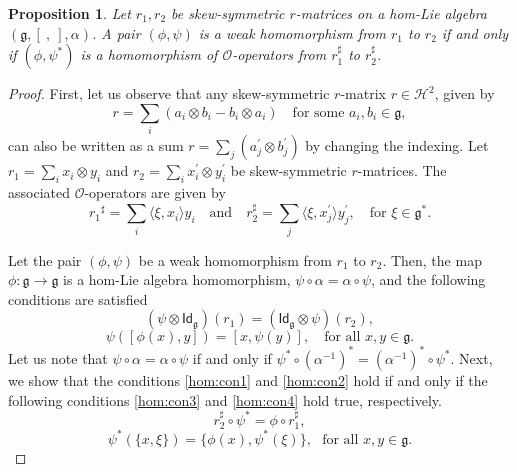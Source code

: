 \documentclass[a4paper,11pt]{amsart}
\theoremstyle{plain}
\newtheorem{proposition}[theorem]{Proposition}
\theoremstyle{definition}
\theoremstyle{remark}
\numberwithin{equation}{section}
\begin{document}
\begin{proposition}
Let $r_1,r_2$ be skew-symmetric $r$-matrices on a hom-Lie algebra $(\mathfrak{g},[~,~],\alpha)$. A pair $(\phi,\psi)$ is a weak homomorphism from $r_1$ to $r_2$ if and only if $(\phi,\psi^*)$ is a homomorphism of $\mathcal{O}$-operators from $r_1^\sharp$ to $r_2^\sharp$.
\end{proposition}
\begin{proof} 
First, let us observe that any skew-symmetric $r$-matrix 
$r\in \mathcal{H}^2$, given by $$r=\sum_{i}(a_i\otimes b_i- b_i\otimes a_i)\quad\mbox{for some } a_i, b_i\in \mathfrak{g},$$ can also be written as a sum $r=\sum_{j}(a_j^\prime\otimes b_j^\prime)$ by changing the indexing. Let $r_1=\sum_i x_i\otimes y_i$ and $r_2=\sum_i x^{\prime}_i\otimes y^{\prime}_i$ be skew-symmetric $r$-matrices. The associated $\mathcal{O}$-operators are given by 
$${r_1}^\sharp=\sum\limits_{i}\langle\xi,x_i\rangle y_i \quad \mbox{and}\quad r_2^\sharp=\sum\limits_{j}\langle\xi,x^{\prime}_j\rangle y^{\prime}_j, \quad\mbox{for }\xi\in \mathfrak{g}^*.$$  

Let the pair $(\phi,\psi)$ be a weak homomorphism from $r_1$ to $r_2$. Then, the map $\phi:\mathfrak{g}\rightarrow \mathfrak{g}$ is a hom-Lie algebra homomorphism, $\psi\circ\alpha=\alpha\circ \psi$, and the following conditions are satisfied
\begin{equation}\label{hom:con1}
(\psi\otimes \mathsf{Id}_{\mathfrak{g}})(r_1)=(\mathsf{Id}_{\mathfrak{g}}\otimes \psi)(r_2), 
\end{equation}
\begin{equation}\label{hom:con2}
\psi([\phi(x),y])=[x,\psi(y)],\quad\mbox{for all }x,y\in \mathfrak{g}.
\end{equation}
Let us note that $\psi\circ\alpha=\alpha\circ \psi$ if and only if $\psi^*\circ(\alpha^{-1})^*=(\alpha^{-1})^*\circ \psi^*$. Next, we show that the conditions \eqref{hom:con1} and \eqref{hom:con2} hold if and only if 
the following conditions \eqref{hom:con3} and \eqref{hom:con4} hold true, respectively.
\begin{equation}\label{hom:con3}
r_2^\sharp\circ \psi^*=\phi\circ r_1^\sharp,
\end{equation}
\begin{equation}\label{hom:con4}
\psi^*(\{x,\xi\})=\{\phi(x),\psi^*(\xi)\}, ~~~\mbox{for all }x,y\in \mathfrak{g}.
\end{equation}


\end{proof}
\end{document}
